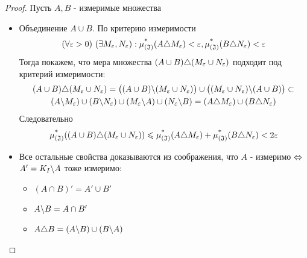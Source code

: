 \begin{proof}
	Пусть $A, B$ - измеримые множества
	\begin{itemize}
		\item Объединение $A \cup B$. По критерию измеримости
		\[
			(\forall \varepsilon > 0)\ (\exists M_\varepsilon, N_\varepsilon) : \operatorname{\mu^*_{(\mathfrak{J})}}(A \triangle M_\varepsilon) < \varepsilon, \operatorname{\mu^*_{(\mathfrak{J})}}(B \triangle N_\varepsilon) < \varepsilon
		\]
		Тогда покажем, что мера множества $(A \cup B) \triangle (M_\varepsilon \cup N_\varepsilon)$ подходит под критерий измеримости:
		\begin{multline*}
			(A \cup B) \triangle (M_\varepsilon \cup N_\varepsilon) = \big((A \cup B) \backslash (M_\varepsilon \cup N_\varepsilon)\big) \cup \big((M_\varepsilon \cup N_\varepsilon) \backslash (A \cup B)\big) \subset
			\\
			(A \backslash M_\varepsilon) \cup (B \backslash N_\varepsilon) \cup (M_\varepsilon \backslash A) \cup (N_\varepsilon \backslash B) = (A \triangle M_\varepsilon) \cup (B \triangle N_\varepsilon)
		\end{multline*}
		Следовательно
		\[
			\operatorname{\mu^*_{(\mathfrak{J})}}((A \cup B) \triangle (M_\varepsilon \cup N_\varepsilon)) \leqslant \operatorname{\mu^*_{(\mathfrak{J})}}(A \triangle M_\varepsilon) + \operatorname{\mu^*_{(\mathfrak{J})}}(B \triangle N_\varepsilon) < 2\varepsilon
		\]
		
		\item Все остальные свойства доказываются из соображения, что $A$ - измеримо $\Leftrightarrow$ $A' = K_I \backslash A$ тоже измеримо:
		\begin{itemize}
			\item \((A \cap B)' = A' \cup B'\)
			
			\item \(A \backslash B = A \cap B'\)
			
			\item \(A \triangle B = (A \backslash B) \cup (B \backslash A)\)
		\end{itemize}
	\end{itemize}
\end{proof}